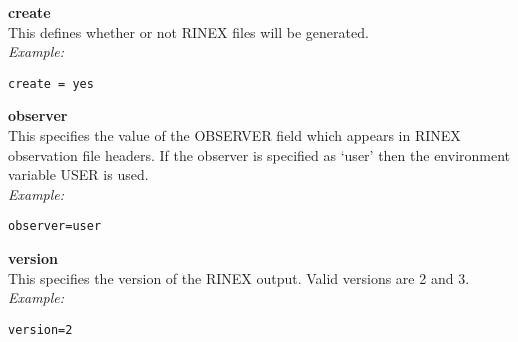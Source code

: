 {\bfseries create}\\
This defines whether or not RINEX files will be generated.\\
\textit{Example:}
\begin{lstlisting}
create = yes
\end{lstlisting}

{\bfseries observer}\\
This specifies the value of the OBSERVER field which appears in RINEX observation file headers.
If the observer is specified as `user' then the environment variable USER is used.\\
\textit{Example:}
\begin{lstlisting}
observer=user
\end{lstlisting}

{\bfseries version}\\
This  specifies the version of the RINEX output. Valid versions are 2 and 3.\\
\textit{Example:}
\begin{lstlisting}
version=2
\end{lstlisting}


